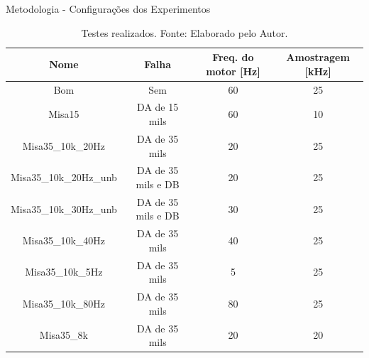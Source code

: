 \documentclass[aspectratio=169]{beamer}
\begin{document}
\begin{frame}{Metodologia - Configurações dos Experimentos}
	\begin{table}[H]
		\label{tab:simulador}
		\centering%
		\begin{minipage}{\textwidth}
		  \begin{tabular*}{\textwidth}{cccc}
			\hline
			{Nome}                   & Falha                     & Freq. do motor [Hz] & Amostragem [kHz]\\ \hline
			\hline
			Bom                      &  Sem                      &      60             &    25  \\ 
			Misa15                   &  DA de 15 mils            &      60             &    10  \\
			Misa35\_10k\_20Hz        &  DA de 35 mils            &      20             &    25  \\
			Misa35\_10k\_20Hz\_unb   &  DA de 35 mils e DB       &      20             &    25  \\
			Misa35\_10k\_30Hz\_unb   &  DA de 35 mils e DB       &      30             &    25  \\
			Misa35\_10k\_40Hz        &  DA de 35 mils            &      40             &    25  \\
			Misa35\_10k\_5Hz         &  DA de 35 mils            &      5              &    25  \\
			Misa35\_10k\_80Hz        &  DA de 35 mils            &      80             &    25  \\
			Misa35\_8k               &  DA de 35 mils            &      20             &    20  \\ \hline
		  \end{tabular*}
		  \caption{Testes realizados. \newline
		  Fonte: Elaborado pelo Autor.} 
		\end{minipage}
	\end{table}
\end{frame}

\end{document}
